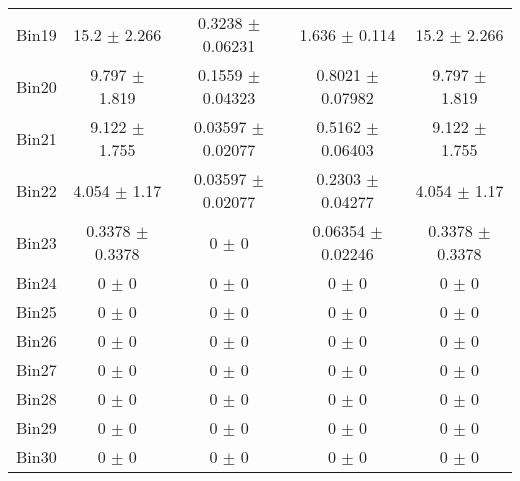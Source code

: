 \begin{tabular}{@{\extracolsep{4pt}}lcccc@{}}
     Bin19 & 15.2 $\pm$ 2.266 & 0.3238 $\pm$ 0.06231 & 1.636 $\pm$ 0.114 & 15.2 $\pm$ 2.266 \\ 
     Bin20 & 9.797 $\pm$ 1.819 & 0.1559 $\pm$ 0.04323 & 0.8021 $\pm$ 0.07982 & 9.797 $\pm$ 1.819 \\ 
     Bin21 & 9.122 $\pm$ 1.755 & 0.03597 $\pm$ 0.02077 & 0.5162 $\pm$ 0.06403 & 9.122 $\pm$ 1.755 \\ 
     Bin22 & 4.054 $\pm$ 1.17 & 0.03597 $\pm$ 0.02077 & 0.2303 $\pm$ 0.04277 & 4.054 $\pm$ 1.17 \\ 
     Bin23 & 0.3378 $\pm$ 0.3378 & 0 $\pm$ 0 & 0.06354 $\pm$ 0.02246 & 0.3378 $\pm$ 0.3378 \\ 
     Bin24 & 0 $\pm$ 0 & 0 $\pm$ 0 & 0 $\pm$ 0 & 0 $\pm$ 0 \\ 
     Bin25 & 0 $\pm$ 0 & 0 $\pm$ 0 & 0 $\pm$ 0 & 0 $\pm$ 0 \\ 
     Bin26 & 0 $\pm$ 0 & 0 $\pm$ 0 & 0 $\pm$ 0 & 0 $\pm$ 0 \\ 
     Bin27 & 0 $\pm$ 0 & 0 $\pm$ 0 & 0 $\pm$ 0 & 0 $\pm$ 0 \\ 
     Bin28 & 0 $\pm$ 0 & 0 $\pm$ 0 & 0 $\pm$ 0 & 0 $\pm$ 0 \\ 
     Bin29 & 0 $\pm$ 0 & 0 $\pm$ 0 & 0 $\pm$ 0 & 0 $\pm$ 0 \\ 
     Bin30 & 0 $\pm$ 0 & 0 $\pm$ 0 & 0 $\pm$ 0 & 0 $\pm$ 0 \\ 
\hline\hline
  \end{tabular}
